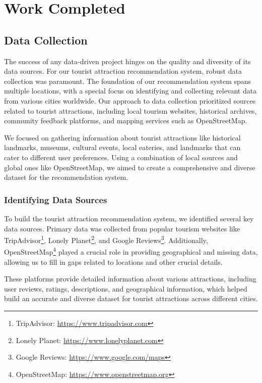 \chapter{Work Completed}

\section{Data Collection}

The success of any data-driven project hinges on the quality and diversity of its data sources. For our tourist attraction recommendation system, robust data collection was paramount. The foundation of our recommendation system spans multiple locations, with a special focus on identifying and collecting relevant data from various cities worldwide. Our approach to data collection prioritized sources related to tourist attractions, including local tourism websites, historical archives, community feedback platforms, and mapping services such as OpenStreetMap.

We focused on gathering information about tourist attractions like historical landmarks, museums, cultural events, local eateries, and landmarks that can cater to different user preferences. Using a combination of local sources and global ones like OpenStreetMap, we aimed to create a comprehensive and diverse dataset for the recommendation system.

\subsection{Identifying Data Sources}
To build the tourist attraction recommendation system, we identified several key data sources. Primary data was collected from popular tourism websites like TripAdvisor\footnote{TripAdvisor: \url{https://www.tripadvisor.com}}, Lonely Planet\footnote{Lonely Planet: \url{https://www.lonelyplanet.com}}, and Google Reviews\footnote{Google Reviews: \url{https://www.google.com/maps}}. Additionally, OpenStreetMap\footnote{OpenStreetMap: \url{https://www.openstreetmap.org}} played a crucial role in providing geographical and missing data, allowing us to fill in gaps related to locations and other crucial details.

These platforms provide detailed information about various attractions, including user reviews, ratings, descriptions, and geographical information, which helped build an accurate and diverse dataset for tourist attractions across different cities.

